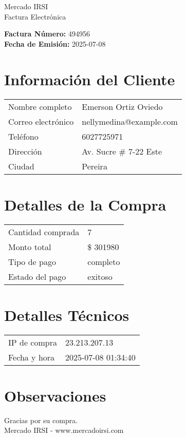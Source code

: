 \documentclass[12pt]{article}
\begin{document}
\begin{center}
    \Huge Mercado IRSI \\
    \Large Factura Electrónica
\end{center}

\vspace{0.5cm}

\noindent \textbf{Factura Número:} 494956 \\
\textbf{Fecha de Emisión:} 2025-07-08

\vspace{0.5cm}

\section*{Información del Cliente}
\begin{longtable}{ll}
Nombre completo & Emerson Ortiz Oviedo \\
Correo electrónico & nellymedina@example.com \\
Teléfono & 6027725971 \\
Dirección & Av. Sucre \# 7-22 Este \\
Ciudad & Pereira \\
\end{longtable}

\vspace{0.5cm}

\section*{Detalles de la Compra}
\begin{longtable}{ll}
Cantidad comprada & 7 \\
Monto total & \$ 301980 \\
Tipo de pago & completo \\
Estado del pago & exitoso \\
\end{longtable}

\vspace{0.5cm}

\section*{Detalles Técnicos}
\begin{longtable}{ll}
IP de compra & 23.213.207.13 \\
Fecha y hora & 2025-07-08 01:34:40 \\
\end{longtable}

\vspace{0.5cm}

\section*{Observaciones}


\vspace{0.5cm}

\begin{center}
    Gracias por su compra. \\
    Mercado IRSI - www.mercadoirsi.com
\end{center}
\end{document}
